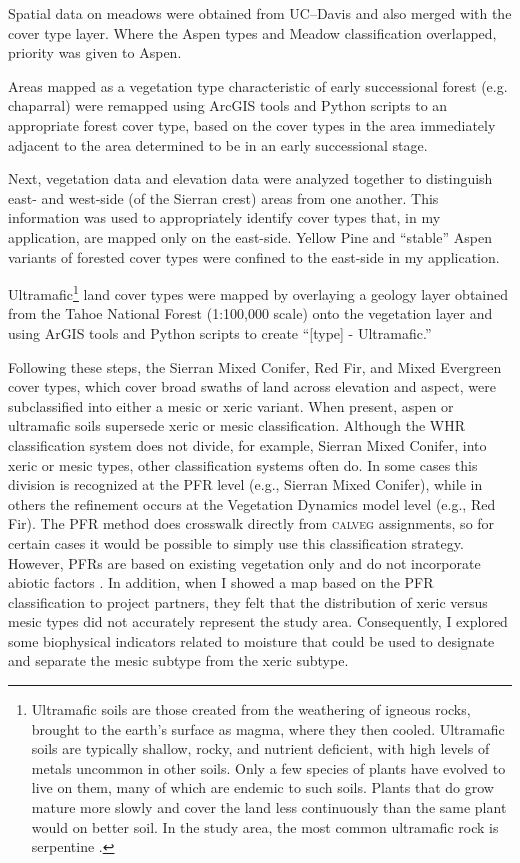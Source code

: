 Spatial data on meadows were obtained from UC--Davis \cite{Fryjoff-Hung2012} and also merged with the cover type layer. Where the Aspen types and Meadow classification overlapped, priority was given to Aspen.

Areas mapped as a vegetation type characteristic of early successional forest (e.g. chaparral) were remapped using ArcGIS tools and Python scripts to an appropriate forest cover type, based on the cover types in the area immediately adjacent to the area determined to be in an early successional stage. 

Next, vegetation data and elevation data were analyzed together to distinguish east- and west-side (of the Sierran crest) areas from one another. This information was used to appropriately identify cover types that, in my application, are mapped only on the east-side. Yellow Pine and ``stable'' Aspen variants of forested cover types were confined to the east-side in my application. 

Ultramafic\footnote{Ultramafic soils are those created from the weathering of igneous rocks, brought to the earth's surface as magma, where they then cooled. Ultramafic soils are typically shallow, rocky, and nutrient deficient, with high levels of metals uncommon in other soils. Only a few species of plants have evolved to live on them, many of which are endemic to such soils. Plants that do grow mature more slowly and cover the land less continuously than the same plant would on better soil. In the study area, the most common ultramafic rock is serpentine \citep{Safford2004}.} land cover types were mapped by overlaying a geology layer obtained from the Tahoe National Forest (1:100,000 scale) onto the vegetation layer and using ArGIS tools and Python scripts to create ``[type] - Ultramafic.'' 

Following these steps, the Sierran Mixed Conifer, Red Fir, and Mixed Evergreen cover types, which cover broad swaths of land across elevation and aspect, were subclassified into either a mesic or xeric variant. When present, aspen or ultramafic soils supersede xeric or mesic classification. Although the WHR classification system does not divide, for example, Sierran Mixed Conifer, into xeric or mesic types, other classification systems often do. In some cases this division is recognized at the PFR level (e.g., Sierran Mixed Conifer), while in others the refinement occurs at the Vegetation Dynamics model level (e.g., Red Fir). The PFR method does crosswalk directly from \textsc{calveg} assignments, so for certain cases it would be possible to simply use this classification strategy. However, PFRs are based on existing vegetation only and do not incorporate abiotic factors \citep{Safford2014}. In addition, when I showed a map based on the PFR classification to project partners, they felt that the distribution of xeric versus mesic types did not accurately represent the study area. Consequently, I explored some biophysical indicators related to moisture that could be used to designate and separate the mesic subtype from the xeric subtype.

